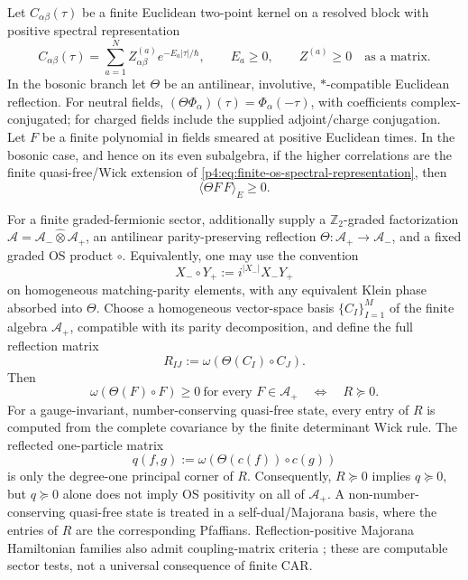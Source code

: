 \documentclass[12pt,a4paper]{article}
\begin{document}
\begin{theorem}
\label{p4:thm:finite-os-positivity}
Let \(C_{\alpha\beta}(\tau)\) be a finite Euclidean two-point kernel on a resolved block with positive spectral representation
\begin{equation}
\label{p4:eq:finite-os-spectral-representation}
C_{\alpha\beta}(\tau)
=
\sum_{a=1}^N
Z^{(a)}_{\alpha\beta}e^{-E_a|\tau|/\hbar},
\qquad
E_a\ge0,
\qquad
Z^{(a)}\ge0
\quad\text{as a matrix.}
\end{equation}
In the bosonic branch let \(\Theta\) be an antilinear, involutive,
\(*\)-compatible Euclidean reflection.  For neutral fields,
\((\Theta\Phi_\alpha)(\tau)=\Phi_\alpha(-\tau)\), with coefficients
complex-conjugated; for charged fields include the supplied adjoint/charge
conjugation.  Let \(F\) be a finite polynomial in fields smeared at positive
Euclidean times.  In the bosonic case, and hence on its even subalgebra, if the higher correlations are
the finite quasi-free/Wick extension of
\eqref{p4:eq:finite-os-spectral-representation}, then
\begin{equation}
\label{p4:eq:finite-os-positivity}
\langle \Theta F\,F\rangle_E\ge0.
\end{equation}

For a finite graded-fermionic sector, additionally supply a
\(\mathbb Z_2\)-graded factorization
\(\mathcal A=\mathcal A_-\widehat\otimes\mathcal A_+\), an antilinear
parity-preserving reflection
\(\Theta:\mathcal A_+\to\mathcal A_-\), and a fixed graded OS product
\(\circ\).  Equivalently, one may use the convention
\[
X_-\circ Y_+:=i^{|X_-|}X_-Y_+
\]
on homogeneous matching-parity elements, with any equivalent Klein phase
absorbed into \(\Theta\).  Choose a homogeneous vector-space basis
\(\{C_I\}_{I=1}^M\) of the finite algebra \(\mathcal A_+\), compatible with
its parity decomposition, and define the full reflection matrix
\[
R_{IJ}:=
\omega\!\left(\Theta(C_I)\circ C_J\right).
\]
Then
\[
\boxed{\quad
\omega\!\left(\Theta(F)\circ F\right)\ge0
\ \text{for every }F\in\mathcal A_+
\quad\Longleftrightarrow\quad
R\succeq0 .
\quad}
\]
For a gauge-invariant, number-conserving quasi-free state, every entry of
\(R\) is computed from the complete covariance by the finite determinant
Wick rule.  The reflected one-particle matrix
\[
q(f,g):=\omega\!\left(\Theta(c(f))\circ c(g)\right)
\]
is only the degree-one principal corner of \(R\).  Consequently,
\(R\succeq0\) implies \(q\succeq0\), but \(q\succeq0\) alone does not imply
OS positivity on all of \(\mathcal A_+\).  A non-number-conserving
quasi-free state is treated in a self-dual/Majorana basis, where the entries
of \(R\) are the corresponding Pfaffians.  Reflection-positive Majorana
Hamiltonian families also admit coupling-matrix criteria
\cite[Theorem~4.2]{JaffeJanssens2016Reflection}; these are computable sector tests, not a
universal consequence of finite CAR.


\end{theorem}
\end{document}

